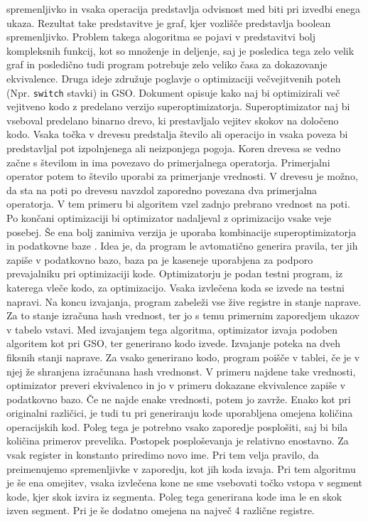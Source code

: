 \documentclass[a4paper, 12pt]{book}
\begin{document}
spremenljivko in vsaka operacija predstavlja odvisnost med biti pri izvedbi enega ukaza. Rezultat take predstavitve je graf, kjer vozlišče predstavlja boolean spremenljivko. Problem takega alogoritma se pojavi v predstavitvi bolj kompleksnih funkcij, kot so množenje in deljenje, saj je posledica tega zelo velik graf in posledično tudi program potrebuje zelo veliko časa za dokazovanje ekvivalence. Druga ideje združuje poglavje o optimizaciji večvejitvenih poteh (Npr. \texttt{switch} stavki) in GSO. Dokument \cite{branch} opisuje kako naj bi optimizirali več vejitveno kodo z predelano verzijo superoptimizatorja. Superoptimizator naj bi vseboval predelano binarno drevo, ki prestavljalo vejitev skokov na določeno kodo. Vsaka točka v drevesu predstalja število ali operacijo in vsaka poveza bi predstavljal pot izpolnjenega ali neizponjega pogoja. Koren drevesa se vedno začne s številom in ima povezavo do primerjalnega operatorja. Primerjalni operator potem to število uporabi za primerjanje vrednosti. V drevesu je možno, da sta na poti po drevesu navzdol zaporedno povezana dva primerjalna operatorja. V tem primeru bi algoritem vzel zadnjo prebrano vrednost na poti. Po končani optimizaciji bi optimizator nadaljeval z oprimizacijo vsake veje posebej. Še ena bolj zanimiva verzija je uporaba kombinacije superoptimizatorja in podatkovne baze \cite{super}. Idea je, da program le avtomatično generira pravila, ter jih zapiše v podatkovno bazo, baza pa je kaseneje uporabjena za podporo prevajalniku pri optimizaciji kode. Optimizatorju je podan testni program, iz katerega vleče kodo, za optimizacijo. Vsaka izvlečena koda se izvede na testni napravi. Na koncu izvajanja, program zabeleži vse žive registre in stanje naprave. Za to stanje izračuna hash vrednost, ter jo s temu primernim zaporedjem ukazov v tabelo vstavi. Med izvajanjem tega algoritma, optimizator izvaja podoben algoritem kot pri GSO, ter generirano kodo izvede. Izvajanje poteka na dveh fiksnih stanji naprave. Za vsako generirano kodo, program poišče v tablei, če je v njej že shranjena izračunana hash vrednonst. V primeru najdene take vrednosti, optimizator preveri ekvivalenco in jo v primeru dokazane ekvivalence zapiše v podatkovno bazo. Če ne najde enake vrednosti, potem jo zavrže. Enako kot pri originalni različici, je tudi tu pri generiranju kode uporabljena omejena količina operacijskih kod. Poleg tega je potrebno vsako zaporedje posplošiti, saj bi bila količina primerov prevelika. Postopek posploševanja je relativno enostavno. Za vsak register in konstanto priredimo novo ime. Pri tem velja pravilo, da preimenujemo spremenljivke v zaporedju, kot jih koda izvaja. Pri tem algoritmu je še ena omejitev, vsaka izvlečena kone ne sme vsebovati točko vstopa v segment kode, kjer skok izvira iz segmenta. Poleg tega generirana kode ima le en skok izven segment. Pri je še dodatno omejena na največ 4 različne registre. 
\end{document}
